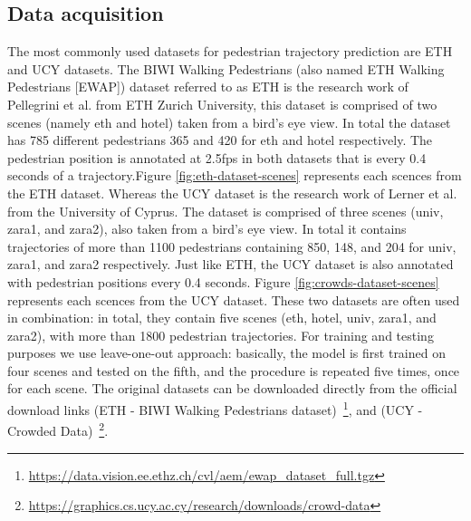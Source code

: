 \subsection{Data acquisition}
The most commonly used datasets for pedestrian trajectory prediction are ETH and UCY datasets.
The BIWI Walking Pedestrians (also named ETH Walking Pedestrians [EWAP]) dataset referred to as ETH \cite[]{ETH-biwi} is the research work of Pellegrini et al. from ETH Zurich University, this dataset is comprised of two scenes (namely eth and hotel) taken from a bird's eye view. In total the dataset has 785 different pedestrians 365 and 420 for eth and hotel respectively. The pedestrian position is annotated at 2.5fps in both datasets that is every 0.4 seconds of a trajectory.Figure \ref{fig:eth-dataset-scenes} represents each scences from the ETH dataset.\newline
Whereas the UCY dataset \cite[]{UCY-crowds} is the research work of Lerner et al. from the University of Cyprus. The dataset is comprised of three scenes (univ, zara1, and zara2), also taken from a bird's eye view. In total it contains trajectories of more than 1100 pedestrians containing 850, 148, and 204 for univ, zara1, and zara2 respectively. Just like ETH, the UCY dataset is also annotated with pedestrian positions every 0.4 seconds. Figure \ref{fig:crowds-dataset-scenes} represents each scences from the UCY dataset.\newline
These two datasets are often used in combination: in total, they contain five scenes (eth, hotel, univ, zara1, and zara2), with more than 1800 pedestrian trajectories. For training and testing purposes we use leave-one-out approach: basically, the model is first trained on four scenes and tested on the fifth, and the procedure is repeated five times, once for each scene.\newline 
The original datasets can be downloaded directly from the official download links (ETH - BIWI Walking Pedestrians dataset)~\footnote{\url{https://data.vision.ee.ethz.ch/cvl/aem/ewap_dataset_full.tgz}}, and (UCY - Crowded Data)~\footnote{\url{https://graphics.cs.ucy.ac.cy/research/downloads/crowd-data}}.

